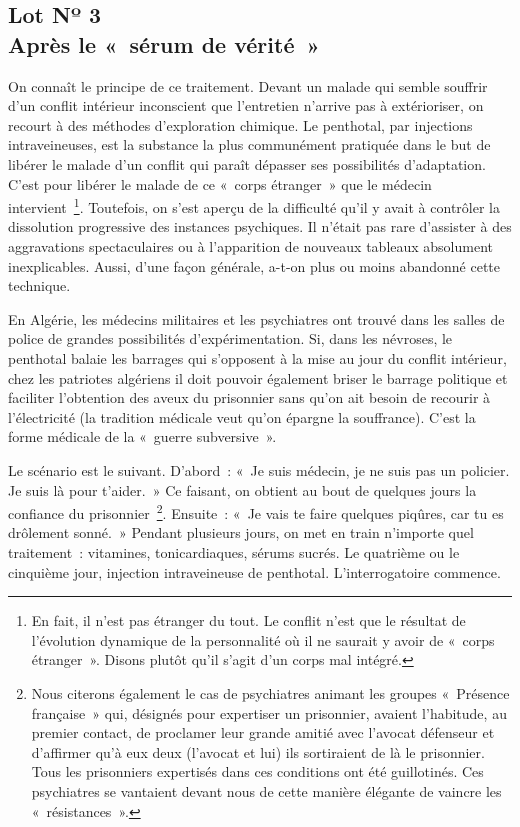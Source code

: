 \documentclass[french,twoside]{book} %
\begin{document}
\subsection[{Lot Nº 3. Après le « sérum de vérité »}]{Lot Nº 3 \\
Après le « sérum de vérité »}
\noindent On connaît le principe de ce traitement. Devant un malade qui semble souffrir d’un conflit intérieur inconscient que l’entretien n’arrive pas à extérioriser, on recourt à des méthodes d’exploration chimique. Le penthotal, par injections intraveineuses, est la substance la plus communément pratiquée dans le but de libérer le malade d’un conflit qui paraît dépasser ses possibilités d’adaptation. C’est pour libérer le malade de ce « corps étranger » que le médecin intervient \footnote{En fait, il n’est pas étranger du tout. Le conflit n’est que le résultat de l’évolution dynamique de la personnalité où il ne saurait y avoir de « corps étranger ». Disons plutôt qu’il s’agit d’un corps mal intégré.}. Toutefois, on s’est aperçu de la difficulté qu’il y avait à contrôler la dissolution progressive des instances psychiques. Il n’était pas rare d’assister à des aggravations spectaculaires ou à l’apparition de nouveaux tableaux absolument inexplicables. Aussi, d’une façon générale, a-t-on plus ou moins abandonné cette technique.\par
En Algérie, les médecins militaires et les psychiatres ont trouvé dans les salles de police de grandes possibilités d’expérimentation. Si, dans les névroses, le penthotal balaie les barrages qui s’opposent à la mise au jour du conflit intérieur, chez les patriotes algériens il doit pouvoir également briser le barrage politique et faciliter l’obtention des aveux du prisonnier sans qu’on ait besoin de recourir à l’électricité (la tradition médicale veut qu’on épargne la souffrance). C’est la forme médicale de la « guerre subversive ».\par
Le scénario est le suivant. D’abord : « Je suis médecin, je ne suis pas un policier. Je suis là pour t’aider. » Ce faisant, on   obtient au bout de quelques jours la confiance du prisonnier \footnote{Nous citerons également le cas de psychiatres animant les groupes « Présence française » qui, désignés pour expertiser un prisonnier, avaient l’habitude, au premier contact, de proclamer leur grande amitié avec l’avocat défenseur et d’affirmer qu’à eux deux (l’avocat et lui) ils sortiraient de là le prisonnier. Tous les prisonniers expertisés dans ces conditions ont été guillotinés. Ces psychiatres se vantaient devant nous de cette manière élégante de vaincre les « résistances ».}. Ensuite : « Je vais te faire quelques piqûres, car tu es drôlement sonné. » Pendant plusieurs jours, on met en train n’importe quel traitement : vitamines, tonicardiaques, sérums sucrés. Le quatrième ou le cinquième jour, injection intraveineuse de penthotal. L’interrogatoire commence.\par
\end{document}

